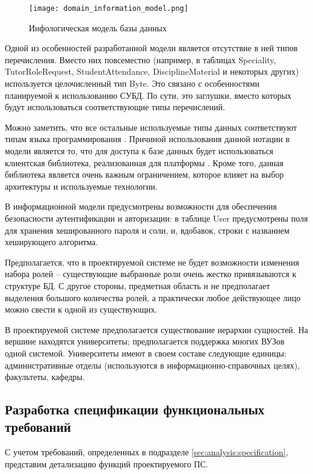 \begin{figure}
\centering
	\texttt{[image: domain\_information\_model.png]}
	\caption{Инфологическая модель базы данных}
	\label{fig:domain:model:db:model}
\end{figure}

Одной из особенностей разработанной модели является отсутствие в ней типов перечисления. Вместо них повсеместно (например, в таблицах Speciality, TutorRoleRequest, StudentAttendance, DisciplineMaterial и некоторых других) используется целочисленный тип Byte. Это связано с особенностями планируемой к использованию СУБД. По сути, это заглушки, вместо которых будут использоваться соответствующие типы перечислений.

Можно заметить, что все остальные используемые типы данных соответствуют типам языка программирования \csharp. Причиной использования данной нотации в модели является то, что для доступа к базе данных будет использоваться клиентская библиотека, реализованная для платформы \dotnet. Кроме того, данная библиотека является очень важным ограничением, которое влияет на выбор архитектуры и используемые технологии.

В информационной модели предусмотрены возможности для обеспечения безопасности аутентификации и авторизации: в таблице User предусмотрены поля для хранения хешированного пароля и соли, и, вдобавок, строки с названием хеширующего алгоритма.

Предполагается, что в проектируемой системе не будет возможности изменения набора ролей -- существующие выбранные роли очень жестко привязываются к структуре БД. С другое стороны, предметная область и не предполагает выделения большого количества ролей, а практически любое действующее лицо можно свести к одной из существующих.

В проектируемой системе предполагается существование иерархии сущностей. На вершине находятся университеты; предполагается поддержка многих ВУЗов одной системой. Университеты имеют в своем составе следующие единицы: административные отделы (используются в информа\-ционно-справочных целях), факультеты, кафедры.

\subsection{Разработка спецификации функциональных требований}
\label{sec:domain:specification}

С учетом требований, определенных в подразделе \ref{sec:analysis:specification}, представим детализацию функций проектируемого ПС.

